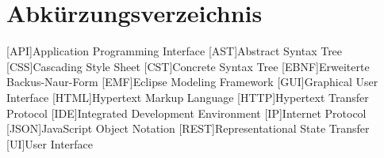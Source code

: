 \chapter*{Abkürzungsverzeichnis}


\begin{acronym}[JSONP]
    \setlength{\itemsep}{0pt}

    [API]{Application Programming Interface}
    [AST]{Abstract Syntax Tree}
    [CSS]{Cascading Style Sheet}
    [CST]{Concrete Syntax Tree}
    [EBNF]{Erweiterte Backus-Naur-Form}
    [EMF]{Eclipse Modeling Framework}
    [GUI]{Graphical User Interface}
    [HTML]{Hypertext Markup Language}
    [HTTP]{Hypertext Transfer Protocol}
    [IDE]{Integrated Development Environment}
    [IP]{Internet Protocol}
    [JSON]{JavaScript Object Notation}
    [REST]{Representational State Transfer}
    [UI]{User Interface}
\end{acronym}

